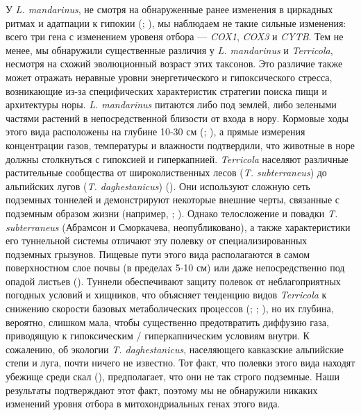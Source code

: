 У \textit{L. mandarinus}, не смотря на обнаруженные ранее изменения в циркадных ритмах и адатпации к гипокии (\cite{Sun2018}; \cite{Dong2020}), мы наблюдаем не такие сильные изменения: всего три гена с изменением уровеня отбора --- \textit{COX1}, \textit{COX3} и \textit{CYTB}. Тем не менее, мы обнаружили существенные различия у \textit{L. mandarinus} и \textit{Terricola}, несмотря на схожий эволюционный возраст этих таксонов. Это различие также может отражать неравные уровни энергетического и гипоксического стресса, возникающие из-за специфических характеристик стратегии поиска пищи и архитектуры норы. \textit{L. mandarinus} питаются либо под землей, либо зелеными частями растений в непосредственной близости от входа в нору. Кормовые ходы этого вида расположены на глубине 10-30 см (\cite{Smorkatcheva1990}; \cite{Hong2019}), а прямые измерения концентрации газов, температуры и влажности подтвердили, что животные в норе должны столкнуться с гипоксией и гиперкапнией. \textit{Terricola} населяют различные растительные сообщества от широколиственных лесов (\textit{T. subterraneus}) до альпийских лугов (\textit{T. daghestanicus}) (\cite{Aulagnier2018}). Они используют сложную сеть подземных тоннелей и демонстрируют некоторые внешние черты, связанные с подземным образом жизни (например, \cite{Aulagnier2018}; \cite{Mironov2020}). Однако телосложение и повадки \textit{T. subterraneus} (Абрамсон и Сморкачева, неопубликовано), а также характеристики его туннельной системы отличают эту полевку от специализированных подземных грызунов. Пищевые пути этого вида располагаются в самом поверхностном слое почвы (в пределах 5-10 см) или даже непосредственно под опадой листьев (\cite{Mironov2020}). Туннели обеспечивают защиту полевок от неблагоприятных погодных условий и хищников, что объясняет тенденцию видов \textit{Terricola} к снижению скорости базовых метаболических процессов (\cite{Caroli2000}; \cite{Jemiolo1983}; \cite{Schropfer1977}), но их глубина, вероятно, слишком мала, чтобы существенно предотвратить диффузию газа, приводящую к гипоксическим / гиперкапническим условиям внутри. К сожалению, об экологии \textit{T. daghestanicus}, населяющего кавказские альпийские степи и луга, почти ничего не известно. Тот факт, что полевки этого вида находят убежище среди скал (\cite{Krystufek2005}), предполагает, что они не так строго подземные. Наши результаты подтверждают этот факт, поэтому мы не обнаружили никаких изменений уровня отбора в митохондриальных генах этого вида. 

